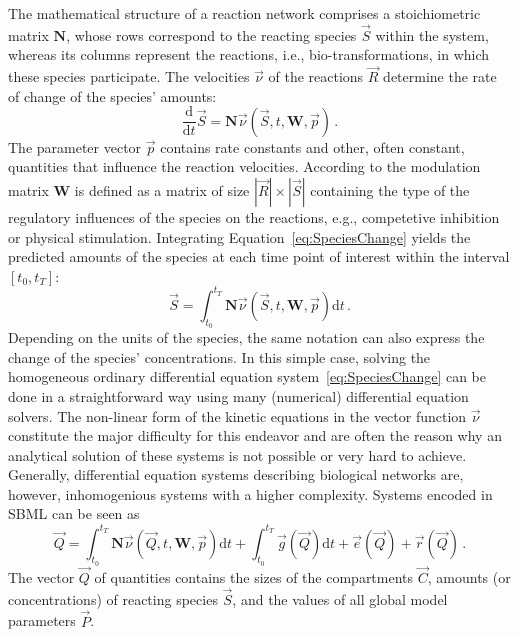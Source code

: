 \documentclass[10pt]{bmc_article}
\newenvironment{bmcformat}{\baselineskip20pt\sloppy\setboolean{publ}{false}}{\baselineskip20pt\sloppy}
\newcommand{\D}{\mathrm{d}}
\begin{document}
\begin{bmcformat}
The mathematical structure of a reaction network comprises a stoichiometric
matrix $\mathbf{N}$, whose rows correspond to the reacting species $\vec{S}$
within the system, whereas its columns represent the reactions, i.e., bio-transformations,
in which these species participate.
The velocities $\vec{\nu}$ of the reactions $\vec{R}$ determine the rate of
change of the species' amounts:
\begin{equation}
\frac{\D}{\D t}\vec{S} = \mathbf{N}\vec{\nu}(\vec{S}, t, \mathbf{W}, \vec{p})\,.
\label{eq:SpeciesChange}
\end{equation}
The parameter vector $\vec{p}$ contains rate constants and other, often
constant, quantities that influence the reaction velocities.
According to \cite{Liebermeister2006, Liebermeister2010} the modulation matrix
$\mathbf{W}$ is defined as a matrix of size $|\vec{R}|\times|\vec{S}|$
containing the type of the regulatory influences of the species on
the reactions, e.g., competetive inhibition or physical stimulation.
Integrating Equation~\ref{eq:SpeciesChange} yields the predicted amounts of the
species at each time point of interest within the interval $[t_0, t_T]$:
\begin{equation}
\vec{S} = \int_{t_0}^{t_T} \mathbf{N}\vec{\nu}(\vec{S}, t, \mathbf{W}, \vec{p})
\D t\,.
\end{equation}
Depending on the units of the species, the same notation can also express the
change of the species' concentrations.
In this simple case, solving the homogeneous ordinary
differential equation system~\ref{eq:SpeciesChange} can be done in a
straightforward way using many (numerical) differential equation solvers.
The non-linear form of the kinetic equations in the vector function $\vec{\nu}$
constitute the major difficulty for this endeavor and are often the reason why
an analytical solution of these systems is not possible or very hard to achieve.
Generally, differential equation systems describing biological networks are,
however, inhomogenious systems with a higher complexity.
Systems encoded in SBML can be seen as
\begin{equation}
\vec{Q} = \int_{t_0}^{t_T} \mathbf{N}\vec{\nu}(\vec{Q}, t, \mathbf{W},
\vec{p})\D t + \int_{t_0}^{t_T} \vec{g}(\vec{Q})\D t + \vec{e}(\vec{Q}) + \vec{r}(\vec{Q})\,.
\label{eq:QuantityValue}
\end{equation}
The vector $\vec{Q}$ of quantities contains the sizes of the
compartments $\vec{C}$, amounts (or concentrations) of reacting species
$\vec{S}$, and the values of all global model parameters $\vec{P}$.

\end{bmcformat}
\end{document}
